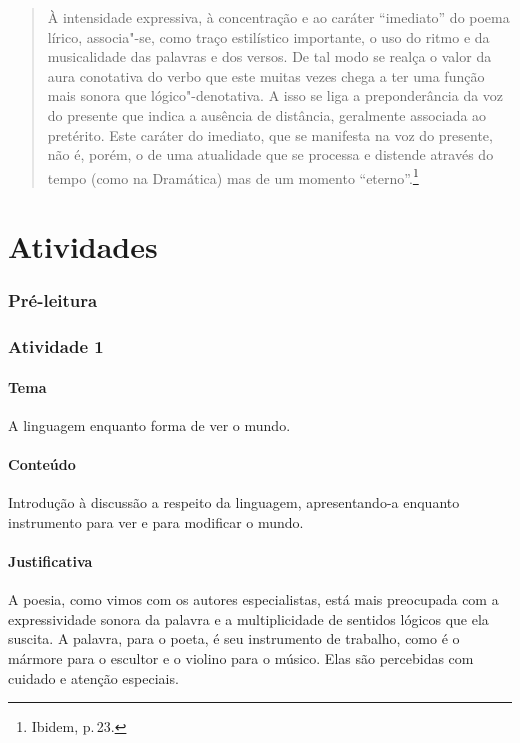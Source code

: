 \documentclass[11pt]{extarticle}
\begin{document}
\begin{quote}
À intensidade expressiva, à concentração e ao caráter ``imediato'' do poema lírico, associa"-se, como traço estilístico importante, o uso do ritmo e da musicalidade das palavras e dos versos. De tal modo se realça o valor da aura conotativa do verbo que este muitas vezes chega a ter uma função mais sonora que lógico"-denotativa. A isso se liga a preponderância da voz do presente que indica a ausência de distância, geralmente associada ao pretérito. Este caráter do imediato, que se manifesta na voz do presente, não é, porém, o de uma atualidade que se processa e distende através do tempo (como na Dramática) mas de um momento ``eterno''.\footnote{Ibidem, p.\,23.}
\end{quote}


\section{Atividades}

\subsubsection{Pré-leitura}


\subsubsection{Atividade 1}

\paragraph{Tema} A linguagem enquanto forma de ver o mundo. 

\paragraph{Conteúdo} Introdução à discussão a respeito da 
linguagem, apresentando-a enquanto instrumento para ver e
para modificar o mundo.

\paragraph{Justificativa} A poesia, como vimos com os autores especialistas,
está mais preocupada com a expressividade sonora da palavra e a multiplicidade
de sentidos lógicos que ela suscita. A palavra, para o poeta,
é seu instrumento de trabalho, como é o mármore para o escultor
e o violino para o músico. Elas são percebidas com cuidado e atenção
especiais. 
\end{document}
